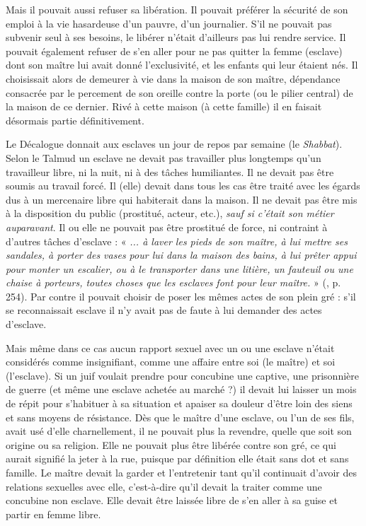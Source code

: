  Mais il pouvait aussi refuser sa libération. Il pouvait préférer la sécurité de son emploi à la vie hasardeuse d'un pauvre, d'un journalier. S'il ne pouvait pas subvenir seul à ses besoins, le libérer n'était d'ailleurs pas lui rendre service. Il pouvait également refuser de s'en aller pour ne pas quitter la femme (esclave) dont son maître lui avait donné l'exclusivité, et les enfants qui leur étaient nés. Il choisissait alors de demeurer à vie dans la maison de son maître, dépendance consacrée par le percement de son oreille contre la porte (ou le pilier central) de la maison de ce dernier. Rivé à cette maison (à cette famille) il en faisait désormais partie définitivement.

 Le Décalogue donnait aux esclaves un jour de repos par semaine (le \emph{Shabbat}). Selon le Talmud un esclave ne devait pas travailler plus longtemps qu'un travailleur libre, ni la nuit, ni à des tâches humiliantes. Il ne devait pas être soumis au travail forcé. Il (elle) devait dans tous les cas être traité avec les égards dus à un mercenaire libre qui habiterait dans la maison. Il ne devait pas être mis à la disposition du public (prostitué, acteur, etc.), \emph{sauf si c'était son métier auparavant}. Il ou elle ne pouvait pas être prostitué de force, ni contraint à d'autres tâches d'esclave : « \emph{... à laver les pieds de son maître, à lui mettre ses sandales, à porter des vases pour lui dans la maison des bains, à lui prêter appui pour monter un escalier, ou à le transporter dans une litière, un fauteuil ou une chaise à porteurs, toutes choses que les esclaves font pour leur maître.} » (, p. 254). Par contre il pouvait choisir de poser les mêmes actes de son plein gré : s'il se reconnaissait esclave il n'y avait pas de faute à lui demander des actes d'esclave.

 Mais même dans ce cas aucun rapport sexuel avec un ou une esclave n'était considérés comme insignifiant, comme une affaire entre soi (le maître) et soi (l'esclave). Si un juif voulait prendre pour concubine une captive, une prisonnière de guerre (et même une esclave achetée au marché ?) il devait lui laisser un mois de répit pour s'habituer à sa situation et apaiser sa douleur d'être loin des siens et sans moyens de résistance. Dès que le maître d'une esclave, ou l'un de ses fils, avait usé d'elle charnellement, il ne pouvait plus la revendre, quelle que soit son origine ou sa religion. Elle ne pouvait plus être libérée contre son gré, ce qui aurait signifié la jeter à la rue, puisque par définition elle était sans dot et sans famille. Le maître devait la garder et l'entretenir tant qu'il continuait d'avoir des relations sexuelles avec elle, c'est-à-dire qu'il devait la traiter comme une concubine non esclave. Elle devait être laissée libre de s'en aller à sa guise et partir en femme libre.

